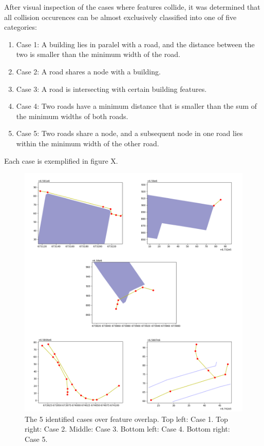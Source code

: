 \documentclass[a4paper]{article}
\begin{document}
After visual inspection of the cases where features collide, it was determined that all collision occurences can be almost exclusively classified into one of five categories:

\begin{enumerate}
\item Case 1: A building lies in paralel with a road, and the distance between the two is smaller than the minimum width of the road.
\item Case 2: A road shares a node with a building.
\item Case 3: A road is intersecting with certain building features.
\item Case 4: Two roads have a minimum distance that is smaller than the sum of the minimum widths of both roads. 
\item Case 5: Two roads share a node, and a subsequent node in one road lies within the minimum width of the other road.
\end{enumerate}

Each case is exemplified in figure X. %

\begin{figure}[H]
    \centering
    \includegraphics[width=\textwidth,height=0.5\textheight,keepaspectratio]{img_feature_overlap_cases}
    \caption{The 5 identified cases over feature overlap. Top left: Case 1. Top right: Case 2. Middle: Case 3. Bottom left: Case 4. Bottom right: Case 5.}
    \label{fig:space}
\end{figure}
\end{document}
